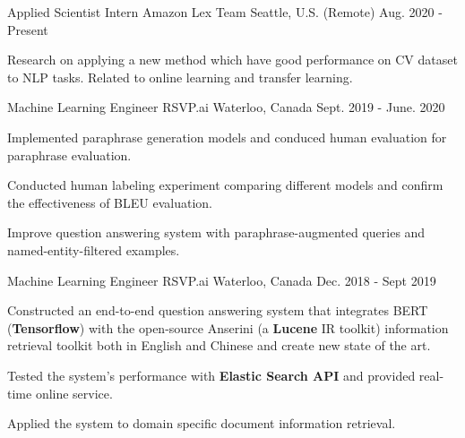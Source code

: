 

\begin{cventries}

  \cventry
    {Applied Scientist Intern} %
    {Amazon Lex Team} %
    {Seattle, U.S. (Remote) } %
    {Aug. 2020 - Present} %
    {
      \begin{cvitems} %
        \item {Research on applying a new method which have good performance on CV dataset to NLP tasks. Related to online learning and transfer learning.}
      \end{cvitems}
    }
    
  \cventry
    {Machine Learning Engineer} %
    {RSVP.ai} %
    {Waterloo, Canada} %
    {Sept. 2019 - June. 2020} %
    {
      \begin{cvitems} %
        \item {Implemented paraphrase generation models and conduced human evaluation for paraphrase evaluation.}
        \item {Conducted human labeling experiment comparing different models and confirm the effectiveness of BLEU evaluation.}
        \item {Improve question answering system with paraphrase-augmented queries and named-entity-filtered examples.}
      \end{cvitems}
    }
 
 \cventry
    {Machine Learning Engineer}
    {RSVP.ai}%
    {Waterloo, Canada} %
    {Dec. 2018 - Sept 2019} %
    {
      \begin{cvitems} %
        \item {Constructed an end-to-end question answering system that integrates BERT (\textbf{Tensorflow}) with the open-source Anserini (a \textbf{Lucene} IR toolkit) information retrieval toolkit both in English and Chinese and create new state of the art.}
	\item {Tested the system's performance with \textbf{Elastic Search API} and provided real-time online service.}
        \item {Applied the system to domain specific document information retrieval.}
      \end{cvitems}
    }
 

\end{cventries}
